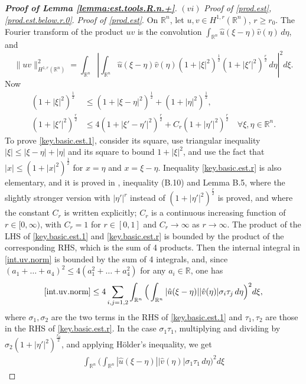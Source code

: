 \documentclass[10pt,reqno,a4paper]{article}
\numberwithin{equation}{section}
\theoremstyle{plain}
\theoremstyle{definition}
\newcommand{\R}{{\mathbb R}}
\begin{document}
\begin{proof}[\textbf{Proof of Lemma \ref{lemma:est.tools.R.n.+}}]
$(vi)$ \emph{Proof of \eqref{prod.est}, \eqref{prod.est.below.r.0}}. 
\emph{Proof of \eqref{prod.est}}. 
On $\R^n$, let $u,v \in H^{1,r}(\R^n)$, $r \geq r_0$.
The Fourier transform of the product $uv$ is the convolution 
$\int_{\R^n} \hat u(\xi - \eta) \hat v(\eta) \, d\eta$, 
and 
\begin{equation} \label{int.uv.norm}
\| uv \|_{H^{1,r}(\R^n)}^2 
= \int_{\R^n} \left| \int_{\R^n} \hat u(\xi - \eta) \hat v(\eta) 
(1 + |\xi|^2)^{\frac12} (1+ |\xi'|^2)^{\frac{r}{2}} \, d\eta \right|^2 d\xi.
\end{equation}
Now 
\begin{align}
(1 + |\xi|^2)^{\frac12}
& \leq (1 + |\xi - \eta|^2)^{\frac12} + (1 + |\eta|^2)^{\frac12},
\label{key.basic.est.1} 
\\
(1+ |\xi'|^2)^{\frac{r}{2}} 
& \leq 4 (1+ |\xi'-\eta'|^2)^{\frac{r}{2}} + C_r (1 + |\eta'|^2)^{\frac{r}{2}} 
\quad \forall \xi, \eta \in \R^n.
\label{key.basic.est.r}
\end{align}
To prove \eqref{key.basic.est.1}, consider its square, 
use triangular inequality $|\xi| \leq |\xi-\eta| + |\eta|$ and its square to bound $1 + |\xi|^2$,
and use the fact that $|x| \leq (1 + |x|^2)^{\frac12}$ for $x=\eta$ and $x = \xi-\eta$.  
Inequality \eqref{key.basic.est.r} is also elementary, 
and it is proved in \cite{Baldi.Haus.AIHP.2023}, inequality (B.10) and Lemma B.5, 
where the slightly stronger version 
with $|\eta'|^r$ instead of $(1 + |\eta'|^2)^{\frac{r}{2}}$ is proved, 
and where the constant $C_r$ is written explicitly; 
$C_r$ is a continuous increasing function of $r \in [0, \infty)$, 
with $C_r = 1$ for $r \in [0,1]$ and $C_r \to \infty$ as $r \to \infty$. 
The product of the LHS  of \eqref{key.basic.est.1} and \eqref{key.basic.est.r} 
is bounded by the product of the corresponding RHS, 
which is the sum of 4 products. 
Then the internal integral in \eqref{int.uv.norm} is bounded by the sum of 4 integrals, 
and, since $(a_1 + \ldots + a_4)^2 \leq 4 (a_1^2 + \ldots + a_4^2)$ for any $a_i \in \R$, 
one has 
\[
\eqref{int.uv.norm} \leq 
4 \sum_{i,j = 1,2} \int_{\R^n} \Big( \int_{\R^n} |\hat u(\xi - \eta)| |\hat v(\eta)| \sigma_i \tau_j 
\, d\eta \Big)^2 d\xi, 
\]
where $\sigma_1, \sigma_2$ are the two terms in the RHS  of \eqref{key.basic.est.1}
and $\tau_1, \tau_2$ are those in the RHS  of \eqref{key.basic.est.r}.
In the case $\sigma_1 \tau_1$, multiplying and dividing by $\sigma_2 (1 + |\eta'|^2)^{\frac{r_0}{2}}$, 
and applying H\"older's inequality, we get  
\begin{align*}
\int_{\R^n} \Big( \int_{\R^n} |\hat u(\xi - \eta)| |\hat v(\eta)| \sigma_1 \tau_1 \, d\eta \Big)^2 d\xi

\end{align*}
\end{proof}
\end{document}
